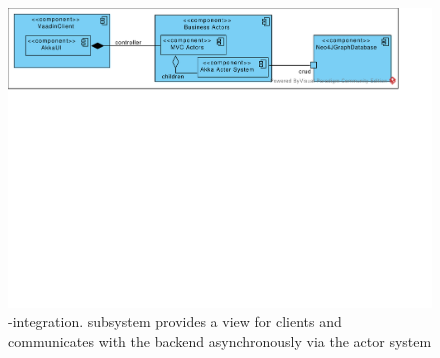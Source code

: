 



\begin{figure}[h]
  \centering
  \includegraphics[scale=.45]{figures/VaadinAkkaIntegration.pdf}
  \caption{\vaadin-\akka integration. \vaadin subsystem provides a
    view for clients and communicates with the backend asynchronously
    via the \akka actor system}
  \label{fig:vai}
\end{figure}




